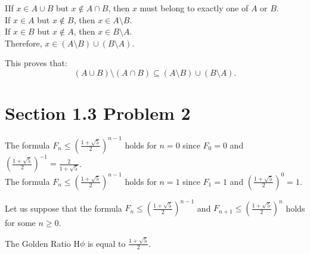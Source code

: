 \documentclass{report}
\begin{document}
\begin{RemarkWithLily}{2}
    IIf $x \in A \cup B$ but $x \notin A \cap B$, then $x$ must belong to exactly one of $A$ or $B$. \\
    If $x \in A$ but $x \notin B$, then $x \in A \setminus B$. \\
    If $x \in B$ but $x \notin A$, then $x \in B \setminus A$. \\
    
    Therefore, $x \in \left(A \setminus B\right) \cup \left(B \setminus A \right)$.

    This proves that:
    \[
    \left( A \cup B \right) \setminus \left( A \cap B \right) \subseteq \left(A \setminus B\right) \cup \left(B \setminus A \right).
    \]
\end{RemarkWithLily}


\section*{Section 1.3 Problem 2}


\begin{basecaseWithPoppy}
    The formula $F_{n} \leq \left(\frac{1 + \sqrt{5}}{2}\right)^{n-1}$ holds for $ n = 0 $ since $ F_{0} = 0 $ and $ \left(\frac{1 + \sqrt{5}}{2}\right)^{-1} = \frac{2}{1 + \sqrt{5}} $.  \\
    The formula $F_{n} \leq \left(\frac{1 + \sqrt{5}}{2}\right)^{n-1}$ holds for $ n = 1 $ since $ F_{1} = 1 $ and $ \left(\frac{1 + \sqrt{5}}{2}\right)^{0} = 1 $. 
\end{basecaseWithPoppy}

\begin{inducthypWithRose}
    Let us suppose that the formula $F_{n} \leq \left(\frac{1 + \sqrt{5}}{2}\right)^{n-1}$ and $F_{n+1} \leq \left(\frac{1 + \sqrt{5}}{2}\right)^{n}$ holds for some $ n \geq 0 $.
\end{inducthypWithRose}    

\begin{RemarkWithLily}{The Golden Ratio}
   H$\phi$ is equal to $\frac{1 + \sqrt{5}}{2}$.    
\end{RemarkWithLily}
\end{document}
